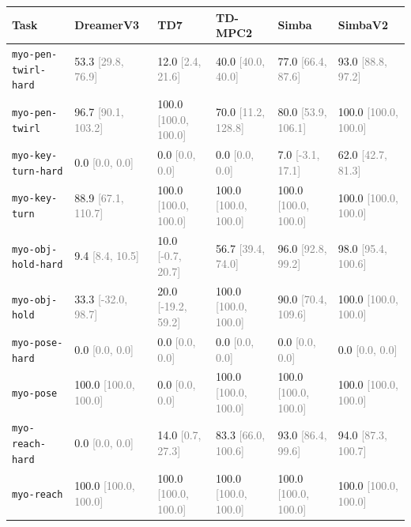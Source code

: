 \begin{tabular}{llllll}
\toprule
\textbf{Task} & \textbf{DreamerV3} & \textbf{TD7} & \textbf{TD-MPC2} & \textbf{Simba} & \textbf{SimbaV2} \\
\midrule
\texttt{myo-pen-twirl-hard} & 53.3 \textcolor{gray}{[29.8, 76.9]} & 12.0 \textcolor{gray}{[2.4, 21.6]} & 40.0 \textcolor{gray}{[40.0, 40.0]} & 77.0 \textcolor{gray}{[66.4, 87.6]} & 93.0 \textcolor{gray}{[88.8, 97.2]} \\
\texttt{myo-pen-twirl} & 96.7 \textcolor{gray}{[90.1, 103.2]} & 100.0 \textcolor{gray}{[100.0, 100.0]} & 70.0 \textcolor{gray}{[11.2, 128.8]} & 80.0 \textcolor{gray}{[53.9, 106.1]} & 100.0 \textcolor{gray}{[100.0, 100.0]} \\
\texttt{myo-key-turn-hard} & 0.0 \textcolor{gray}{[0.0, 0.0]} & 0.0 \textcolor{gray}{[0.0, 0.0]} & 0.0 \textcolor{gray}{[0.0, 0.0]} & 7.0 \textcolor{gray}{[-3.1, 17.1]} & 62.0 \textcolor{gray}{[42.7, 81.3]} \\
\texttt{myo-key-turn} & 88.9 \textcolor{gray}{[67.1, 110.7]} & 100.0 \textcolor{gray}{[100.0, 100.0]} & 100.0 \textcolor{gray}{[100.0, 100.0]} & 100.0 \textcolor{gray}{[100.0, 100.0]} & 100.0 \textcolor{gray}{[100.0, 100.0]} \\
\texttt{myo-obj-hold-hard} & 9.4 \textcolor{gray}{[8.4, 10.5]} & 10.0 \textcolor{gray}{[-0.7, 20.7]} & 56.7 \textcolor{gray}{[39.4, 74.0]} & 96.0 \textcolor{gray}{[92.8, 99.2]} & 98.0 \textcolor{gray}{[95.4, 100.6]} \\
\texttt{myo-obj-hold} & 33.3 \textcolor{gray}{[-32.0, 98.7]} & 20.0 \textcolor{gray}{[-19.2, 59.2]} & 100.0 \textcolor{gray}{[100.0, 100.0]} & 90.0 \textcolor{gray}{[70.4, 109.6]} & 100.0 \textcolor{gray}{[100.0, 100.0]} \\
\texttt{myo-pose-hard} & 0.0 \textcolor{gray}{[0.0, 0.0]} & 0.0 \textcolor{gray}{[0.0, 0.0]} & 0.0 \textcolor{gray}{[0.0, 0.0]} & 0.0 \textcolor{gray}{[0.0, 0.0]} & 0.0 \textcolor{gray}{[0.0, 0.0]} \\
\texttt{myo-pose} & 100.0 \textcolor{gray}{[100.0, 100.0]} & 0.0 \textcolor{gray}{[0.0, 0.0]} & 100.0 \textcolor{gray}{[100.0, 100.0]} & 100.0 \textcolor{gray}{[100.0, 100.0]} & 100.0 \textcolor{gray}{[100.0, 100.0]} \\
\texttt{myo-reach-hard} & 0.0 \textcolor{gray}{[0.0, 0.0]} & 14.0 \textcolor{gray}{[0.7, 27.3]} & 83.3 \textcolor{gray}{[66.0, 100.6]} & 93.0 \textcolor{gray}{[86.4, 99.6]} & 94.0 \textcolor{gray}{[87.3, 100.7]} \\
\texttt{myo-reach} & 100.0 \textcolor{gray}{[100.0, 100.0]} & 100.0 \textcolor{gray}{[100.0, 100.0]} & 100.0 \textcolor{gray}{[100.0, 100.0]} & 100.0 \textcolor{gray}{[100.0, 100.0]} & 100.0 \textcolor{gray}{[100.0, 100.0]} \\

\end{tabular}
